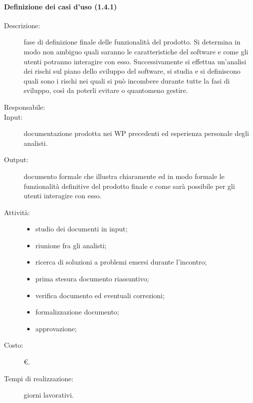 \paragraph{Definizione dei casi d'uso (1.4.1)}
\begin{description}
\item[Descrizione:]fase di definizione finale delle funzionalità del prodotto. Si determina in modo non ambiguo quali saranno le caratteristiche del software e come gli utenti potranno interagire con esso. Successivamente si effettua un'analisi dei rischi sul piano dello sviluppo del software, si studia e si definiscono quali sono i rischi nei quali si può incombere durante tutte la fasi di sviluppo, così da poterli evitare o quantomeno gestire.
\item[Responsabile:] 
\item[Input: ]documentazione prodotta nei WP precedenti ed esperienza personale degli analisti.
\item[Output:] documento formale che illustra chiaramente ed in modo formale le funzionalità definitive del prodotto finale e come sarà possibile per gli utenti interagire con esso.
\item[Attività:]
\begin{itemize}
\item studio dei documenti in input;
\item riunione fra gli analisti;
\item ricerca di soluzioni a problemi emersi durante l'incontro;
\item prima stesura documento riassuntivo;
\item verifica documento ed eventuali correzioni;
\item formalizzazione documento;
\item approvazione;
\end{itemize}
\item[Costo:] \euro{}.
\item[Tempi di realizzazione:]  giorni lavorativi.
\end{description}

